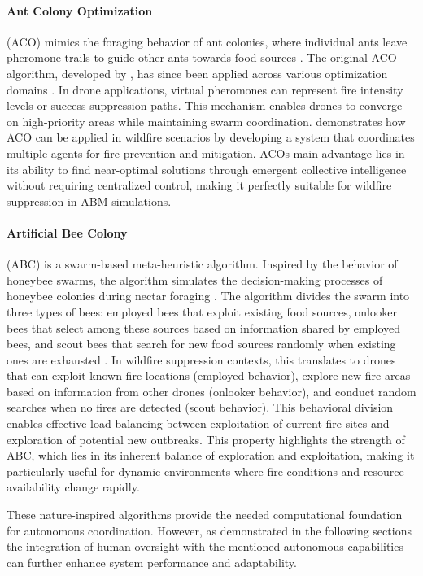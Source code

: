 \documentclass[11pt, a4paper]{article}
\begin{document}
\paragraph{Ant Colony Optimization} (ACO) mimics the foraging behavior of ant colonies, where individual ants leave pheromone trails to guide other ants towards food sources \citep{ACO}. The original ACO algorithm, developed by \citet*{ACO}, has since been applied across various optimization domains \citep{ACO_recent_advances}.
In drone applications, virtual pheromones can represent fire intensity levels or success suppression paths. This mechanism enables drones to converge on high-priority areas while maintaining swarm coordination.
\citet*{HybridAntColonyWildfire} demonstrates how ACO can be applied in wildfire scenarios by developing a system that coordinates multiple agents for fire prevention and mitigation. ACOs main advantage lies in its ability to find near-optimal solutions through emergent collective intelligence without requiring centralized control, making it perfectly suitable for wildfire suppression in ABM simulations.


\paragraph{Artificial Bee Colony} (ABC) is a swarm-based meta-heuristic algorithm. Inspired by the behavior of honeybee swarms, the algorithm simulates the decision-making processes of honeybee colonies during nectar foraging \citep{karaboga2007abc}. The algorithm divides the swarm into three types of bees: employed bees that exploit existing food sources, onlooker bees that select among these sources based on information shared by employed bees, and scout bees that search for new food sources randomly when existing ones are exhausted \citep{karaboga2007abc}.
In wildfire suppression contexts, this translates to drones that can exploit known fire locations (employed behavior), explore new fire areas based on information from other drones (onlooker behavior), and conduct random searches when no fires are detected (scout behavior). This behavioral division enables effective load balancing between exploitation of current fire sites and exploration of potential new outbreaks. This property highlights the strength of ABC, which lies in its inherent balance of exploration and exploitation, making it particularly useful for dynamic environments where fire conditions and resource availability change rapidly.

These nature-inspired algorithms provide the needed computational foundation for autonomous coordination. However, as demonstrated in the following sections the integration of human oversight with the mentioned autonomous capabilities can further enhance system performance and adaptability.
\end{document}
